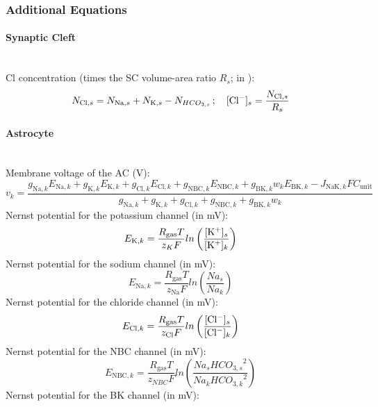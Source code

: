 \subsubsection*{Additional Equations}
\paragraph{Synaptic Cleft}~\\
%
\gls{Cl} concentration  (times the SC volume-area ratio $R_s$; in \uMm): 
\begin{equation} \label{eq:ClEx}
N_{\text{Cl},s}= N_{\text{Na},s}+N_{\text{K},s}-N_{ HCO_{3,s}}\,; \text{~~~} [\text{Cl$^-$}]_s = \frac{N_{\text{Cl},s}}{R_s}
\end{equation}

\paragraph{Astrocyte}~\\
%
Membrane voltage of the \gls{AC} (V):
\begin{equation} \label{eq:v_k}
v_k = \frac{g_{\text{Na},k} E_{\text{Na},k} + g_{\text{K},k} E_{\text{K},k} + g_{\text{Cl},k}E_{\text{Cl},k}+g_{\text{NBC},k}E_{\text{NBC},k} + g_{\text{BK},k}w_kE_{\text{BK},k} -J_{\text{NaK},k}F C_{\text{unit}} } { g_{\text{Na},k}+g_{\text{K},k} + g_{\text{Cl},k} + g_{\text{NBC},k} + g_{\text{BK},k}w_k }
\end{equation}
%
Nernst potential for the potassium channel (in mV):
\begin{equation} \label{eq:E_K}
E_{\text{K},k}=\frac{R_{\text{gas}}T}{z_K F}ln\left( \frac{[\text{K$^+$}]_s}{[\text{K$^+$}]_k}\right) 
\end{equation}
%
Nernst potential for the sodium channel (in mV):
\begin{equation} \label{eq:E_Na}
E_{\text{Na},k}=\frac{R_{\text{gas}}T}{z_{\text{Na}} F}ln\left( \frac{Na_s}{Na_k}\right) 
\end{equation}
%
Nernst potential for the chloride channel (in mV):
\begin{equation} \label{eq:E_Cl}
E_{\text{Cl},k} = \frac{R_{\text{gas}}T}{z_{\text{Cl}} F}ln\left( \frac{[\text{Cl$^-$}]_s}{[\text{Cl$^-$}]_k}\right) 
\end{equation}
%
Nernst potential for the NBC channel (in mV):
\begin{equation} \label{eq:E_NBC}
E_{\text{NBC},k} = \frac{R_{\text{gas}}T}{z_{NBC} F}ln\left( \frac{Na_s {HCO_{3,s}}^2}{Na_k {HCO_{3,k}}^2}\right) 
\end{equation}
Nernst potential for the BK channel (in mV):
